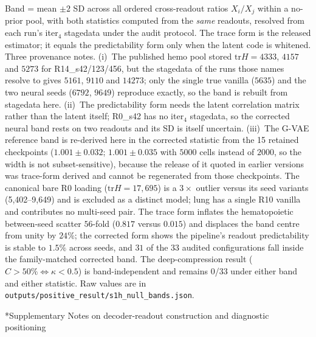 \documentclass[11pt,a4paper]{article}
\makeatletter
\renewcommand{\section}{\@startsection{section}{1}{0pt}{12pt plus 6pt}{6pt}{\large\bfseries}}
\makeatother
\begin{document}
\begin{table}[ht]
\footnotesize{Band = mean $\pm2$ SD across all ordered cross-readout ratios $X_i/X_j$ within a no-prior pool, with both statistics computed from the \emph{same} readouts, resolved from each run's iter$_4$ stagedata under the audit protocol. The trace form is the released estimator; it equals the predictability form only when the latent code is whitened. Three provenance notes. (i)~The published hemo pool stored $\mathrm{tr}H=4333$, $4157$ and $5273$ for R14\_s42/123/456, but the stagedata of the runs those names resolve to gives $5161$, $9110$ and $14273$; only the single true vanilla ($5635$) and the two neural seeds ($6792$, $9649$) reproduce exactly, so the band is rebuilt from stagedata here. (ii)~The predictability form needs the latent correlation matrix rather than the latent itself; R0\_s42 has no iter$_4$ stagedata, so the corrected neural band rests on two readouts and its SD is itself uncertain. (iii)~The G-VAE reference band is re-derived here in the corrected statistic from the 15 retained checkpoints ($1.001\pm0.032$; $1.001\pm0.035$ with $5000$ cells instead of $2000$, so the width is not subset-sensitive), because the release of it quoted in earlier versions was trace-form derived and cannot be regenerated from those checkpoints. The canonical bare R0 loading ($\mathrm{tr}H=17{,}695$) is a $3\times$ outlier versus its seed variants (5,402--9,649) and is excluded as a distinct model; lung has a single R10 vanilla and contributes no multi-seed pair. The trace form inflates the hematopoietic between-seed scatter $56$-fold ($0.817$ versus $0.015$) and displaces the band centre from unity by $24\%$; the corrected form shows the pipeline's readout predictability is stable to $1.5\%$ across seeds, and $31$ of the $33$ audited configurations fall inside the family-matched corrected band. The deep-compression result ($C>50\%\Leftrightarrow\kappa<0.5$) is band-independent and remains 0/33 under either band and either statistic. Raw values are in \texttt{outputs/positive\_result/s1h\_null\_bands.json}.}
\label{tab:unagi_band}
\end{table}

\section*{Supplementary Notes on decoder-readout construction and diagnostic positioning}
\end{document}
